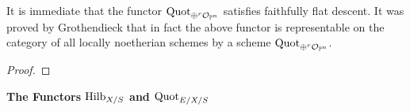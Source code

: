 \begin{theorem*}\label{nhq-projective-quot-representability}
It is immediate that the functor $\operatorname{Quot}_{\oplus^r {\mathcal O}_{\mathbb{P}^n}}$
satisfies faithfully flat descent. It was proved by
Grothendieck that in fact the above functor
is representable on the category of all locally noetherian schemes
by a scheme $\operatorname{Quot}_{\oplus^r{\mathcal O}_{\mathbb{P}^n}}$.
\end{theorem*}

\begin{proof}
\notready
\end{proof}


\medskip


\bigskip

\centerline{\large\bf The Functors $\operatorname{Hilb}_{X/S}$ and $\operatorname{Quot}_{E/X/S}$}

\medskip

